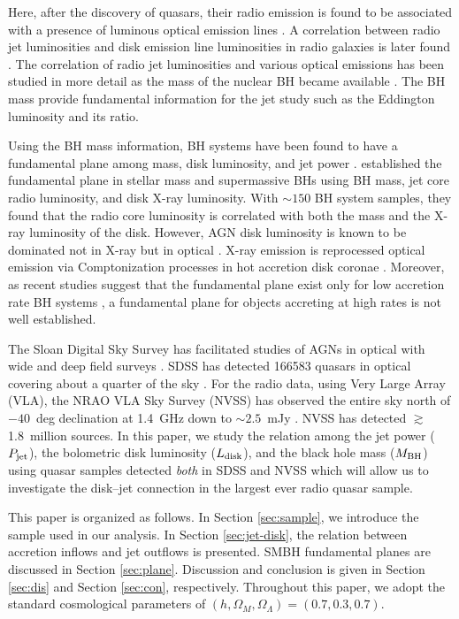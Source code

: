 \documentclass[preprint2,twocolappendix]{aastex6}
\begin{document}
Here, after the discovery of quasars, their radio emission is found to be associated with a presence of luminous optical emission lines \citep{baa54,ost77,gra78}. A correlation between radio jet luminosities and disk emission line luminosities in radio galaxies is later found \citep[e.g.][]{bau89,sau89,raw89,raw91,zir95,wil99,but10,koz11,sik13}. The correlation of radio jet luminosities and various optical emissions has been studied in more detail as the mass of the nuclear BH became available \citep[e.g.][]{woo02}. The BH mass provide fundamental information for the jet study such as the Eddington luminosity and its ratio.

Using the BH mass information, BH systems have been found to have a fundamental plane among mass, disk luminosity, and jet power \citep[e.g.][]{ter03, mer03,mac03}. \citet{mer03} established the fundamental plane in stellar mass and supermassive BHs using BH mass, jet core radio luminosity, and disk X-ray luminosity. With $\sim150$ BH system samples, they found that the radio core luminosity is correlated with both the mass and the X-ray luminosity of the disk. However, AGN disk luminosity is known to be dominated not in X-ray but in optical \citep[e.g.,][]{elv94}. X-ray emission is reprocessed optical emission via Comptonization processes in hot accretion disk coronae \citep[e.g.,][]{kat76,poz77,sun80}. Moreover, as recent studies suggest that the fundamental plane exist only for low accretion rate BH systems \citep[see e.g.][]{mer08,plo12}, a fundamental plane for objects accreting at high rates is not well established.

The Sloan Digital Sky Survey \citep[SDSS;][]{yor00} has facilitated studies of AGNs in optical with wide and deep field surveys \citep[e.g.][]{she11}. SDSS has detected 166583 quasars in optical covering about a quarter of the sky \citep{par14}. For the radio data, using Very Large Array (VLA), the NRAO VLA Sky Survey (NVSS) has observed the entire sky north of $-40$~deg declination at 1.4~GHz down to $\sim2.5$~mJy \citep{con98}. NVSS has detected $\gtrsim$1.8~million sources. In this paper, we study the relation among the jet power ($P_{\rm jet}$), the bolometric disk luminosity ($L_{\rm disk}$), and the black hole mass ($M_{\rm BH}$) using quasar samples detected {\it both} in SDSS and NVSS which will allow us to investigate the disk--jet connection in the largest ever radio quasar sample.

This paper is organized as follows. In Section \ref{sec:sample}, we introduce the sample used in our analysis. In Section \ref{sec:jet-disk}, the relation between accretion inflows and jet outflows is presented. SMBH fundamental planes are discussed in Section \ref{sec:plane}. Discussion and conclusion is given in Section \ref{sec:dis} and Section \ref{sec:con}, respectively. Throughout this paper, we adopt the standard cosmological parameters of $(h, \Omega_M , \Omega_\Lambda) = (0.7, 0.3, 0.7)$.
\end{document}
